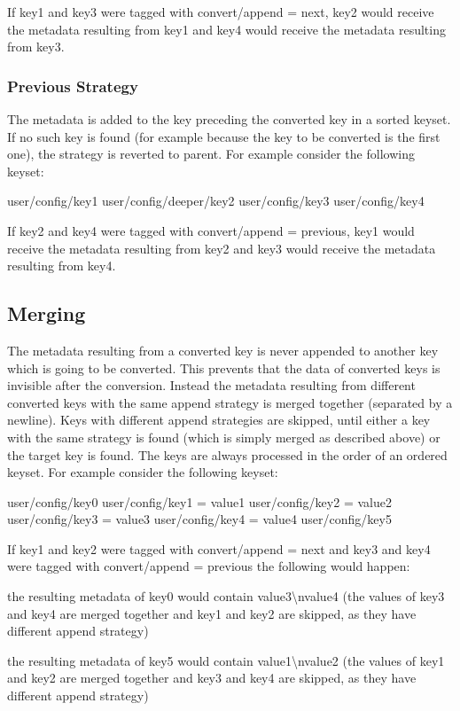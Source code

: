 If key1 and key3 were tagged with {\ttfamily convert/append = next}, key2 would receive the metadata resulting from key1 and key4 would receive the metadata resulting from key3.

\subsubsection*{Previous Strategy}

The metadata is added to the key preceding the converted key in a sorted keyset. If no such key is found (for example because the key to be converted is the first one), the strategy is reverted to parent. For example consider the following keyset\+: \begin{DoxyVerb}user/config/key1
user/config/deeper/key2
user/config/key3
user/config/key4
\end{DoxyVerb}


If key2 and key4 were tagged with {\ttfamily convert/append = previous}, key1 would receive the metadata resulting from key2 and key3 would receive the metadata resulting from key4.

\subsection*{Merging}

The metadata resulting from a converted key is never appended to another key which is going to be converted. This prevents that the data of converted keys is invisible after the conversion. Instead the metadata resulting from different converted keys with the same append strategy is merged together (separated by a newline). Keys with different append strategies are skipped, until either a key with the same strategy is found (which is simply merged as described above) or the target key is found. The keys are always processed in the order of an ordered keyset. For example consider the following keyset\+: \begin{DoxyVerb}user/config/key0
user/config/key1 = value1
user/config/key2 = value2
user/config/key3 = value3
user/config/key4 = value4
user/config/key5
\end{DoxyVerb}


If key1 and key2 were tagged with {\ttfamily convert/append = next} and key3 and key4 were tagged with {\ttfamily convert/append = previous} the following would happen\+:


\begin{DoxyItemize}
\item the resulting metadata of key0 would contain {\ttfamily value3\textbackslash{}nvalue4} (the values of key3 and key4 are merged together and key1 and key2 are skipped, as they have different append strategy)
\item the resulting metadata of key5 would contain {\ttfamily value1\textbackslash{}nvalue2} (the values of key1 and key2 are merged together and key3 and key4 are skipped, as they have different append strategy)
\end{DoxyItemize}

